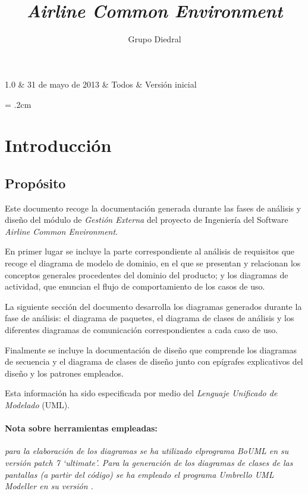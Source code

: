 \documentclass[11pt, a4paper, twoside, titlepage]{article}
\title{\doctitle\\\textsl{Airline Common Environment}}
\author{Grupo Diedral}
\newcommand*{\doctitle}{Análisis y diseño}
\newcommand*{\docversion}{1.0}
\begin{document}
	\begin{tablacambios}
		1.0 & 31 de mayo de 2013 & Todos & Versión inicial
	\end{tablacambios}


	\portadaace{\doctitle}{\docversion}

	\tableofcontents
	\newpage

	\iniciarnumeraciondiedral

	\parskip = .2cm

	\section{Introducción}
		\subsection{Propósito}
			Este documento recoge la documentación generada durante las fases de análisis y diseño del módulo de \textit{Gestión Externa} del proyecto de Ingeniería del Software \textit{Airline Common Environment}.

			En primer lugar se incluye la parte correspondiente al análisis de requisitos que recoge el diagrama de modelo de dominio, en el que se presentan y relacionan los conceptos generales procedentes del dominio del producto; y los diagramas de actividad, que enuncian el flujo de comportamiento de los casos de uso.

			La siguiente sección del documento desarrolla los diagramas generados durante la fase de análisis: el diagrama de paquetes, el diagrama de clases de análisis y los diferentes diagramas de comunicación correspondientes a cada caso de uso.

			Finalmente se incluye la documentación de diseño que comprende los diagramas de secuencia y el diagrama de clases de diseño junto con epígrafes explicativos del diseño y los patrones empleados.


		Esta información ha sido especificada por medio del {\itshape Lenguaje Unificado de Modelado} (UML).

		\paragraph*{Nota sobre herramientas empleadas:} {\itshape para la elaboración de los diagramas se ha utilizado el\break programa {\normalfont BoUML} en su versión { patch 7 `ultimate'}. Para la generación de los diagramas de clases de las pantallas (a partir del código) se ha empleado el programa {\normalfont Umbrello UML Modeller} en su versión {}.}
\end{document}
